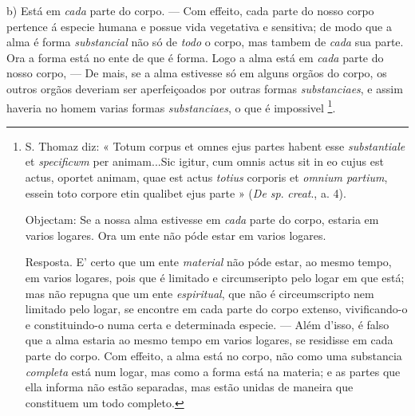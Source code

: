 b) Está em \emph{cada} parte do corpo. --- Com effeito, cada parte do nosso corpo pertence á especie humana e possue vida vegetativa e sensitiva; de modo que a alma é forma \emph{substancial} não só de \emph{todo} o corpo, mas tambem de \emph{cada} sua parte. Ora a forma está no ente de que é forma. Logo a alma está em \emph{cada} parte do nosso corpo, --- De mais, se a alma estivesse só em alguns orgãos do corpo, os outros orgãos deveriam ser   aperfeiçoados por outras formas \emph{substanciaes}, e assim haveria no homem varias formas \emph{substanciaes}, o que é impossivel \footnote{S. Thomaz diz: « Totum corpus et omnes ejus partes habent esse \emph{substantiale} et \emph{specificwm} per animam...Sic igitur, cum omnis actus sit in eo cujus est actus, oportet animam, quae est actus \emph{totius} corporis et \emph{omnium partium}, essein toto corpore etin qualibet ejus parte » (\emph{De sp}. \emph{creat}., a. 4).\par Objectam: Se a nossa alma estivesse em \emph{cada} parte do corpo, estaria em varios logares. Ora um ente não póde estar em varios logares.\par Resposta. E' certo que um ente \emph{material} não póde estar, ao mesmo tempo, em varios logares, pois que é limitado e circumseripto pelo logar em que está; mas não repugna que um ente \emph{espiritual}, que não é circeumscripto nem limitado pelo logar, se encontre em cada parte do corpo extenso, vivificando-o e constituindo-o numa certa e determinada especie. --- Além d'isso, é falso que a alma estaria ao mesmo tempo em varios logares, se residisse em cada parte do corpo. Com effeito, a alma está no corpo, não como uma substancia \emph{completa} está num logar, mas como a forma está na materia; e as partes que ella informa não estão separadas, mas estão unidas de maneira que constituem um todo completo.}.


